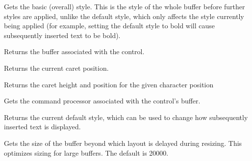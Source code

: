 
Gets the basic (overall) style. This is the style of the whole
buffer before further styles are applied, unlike the default style, which
only affects the style currently being applied (for example, setting the default
style to bold will cause subsequently inserted text to be bold).

\label{wxrichtextctrlgetbuffer}



Returns the buffer associated with the control.

\label{wxrichtextctrlgetcaretposition}


Returns the current caret position.

\label{wxrichtextctrlgetcaretpositionforindex}


Returns the caret height and position for the given character position

\label{wxrichtextctrlgetcommandprocessor}


Gets the command processor associated with the control's buffer.

\label{wxrichtextctrlgetdefaultstyle}


Returns the current default style, which can be used to change how subsequently inserted
text is displayed.

\label{wxrichtextctrlgetdelayedlayoutthreshold}


Gets the size of the buffer beyond which layout is delayed during resizing.
This optimizes sizing for large buffers. The default is 20000.

